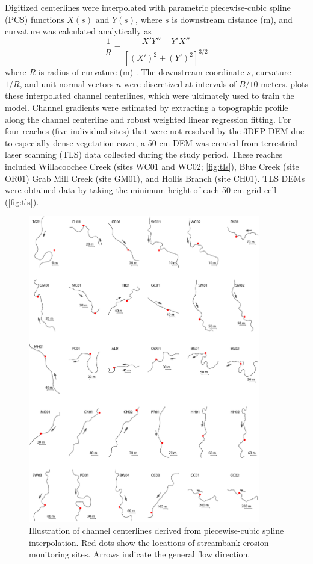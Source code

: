 \documentclass[preprint, review, authoryear, 12pt]{elsarticle}
\begin{document}
Digitized centerlines were interpolated with parametric piecewise-cubic spline (PCS) functions $X(s)$ and $Y(s)$, where $s$ is downstream distance (m), and curvature was calculated analytically as 
\begin{equation}
\frac{1}{R} = \frac{\displaystyle X'Y'' - Y'X''}{\displaystyle \left[(X')^{2} + (Y')^{2}\right]^{3/2}}
\end{equation}
where $R$ is radius of curvature (m) \citep{Guneralp2007}. The downstream coordinate $s$, curvature $1/R$, and unit normal vectors $n$ were discretized at intervals of $B/10$ meters.  plots these interpolated channel centerlines, which were ultimately used to train the model. Channel gradients were estimated by extracting a topographic profile along the channel centerline and robust weighted linear regression fitting. For four reaches (five individual sites) that were not resolved by the 3DEP DEM due to especially dense vegetation cover, a 50 cm DEM was created from terrestrial laser scanning (TLS) data collected during the study period. These reaches included Willacoochee Creek (sites WC01 and WC02; \cref{fig:tls}), Blue Creek (site OR01) Grab Mill Creek (site GM01), and Hollis Branch (site CH01). TLS DEMs were obtained data by taking the minimum height of each 50 cm grid cell (\cref{fig:tls}).

\begin{figure}
\centering
\includegraphics[width=0.9\textwidth]{figs/centerlines.pdf}
\caption{Illustration of channel centerlines derived from piecewise-cubic spline interpolation. Red dots show the locations of streambank erosion monitoring sites. Arrows indicate the general flow direction.}\label{fig:centerlines}
\end{figure}
\end{document}
